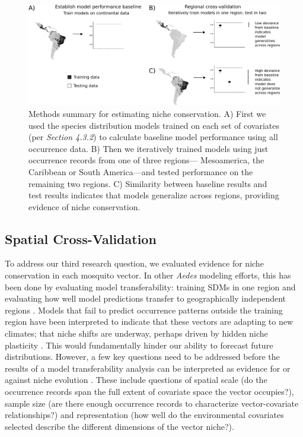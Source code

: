 \begin{figure}
\includegraphics[width=\textwidth]{figures/ch3-cv-conceptual2.pdf}
\centering
\caption[Methods summary for estimating niche conservation.]{Methods summary for estimating niche conservation. A) First we used the species distribution models trained on each set of covariates (per \textit{Section 4.3.2}) to calculate baseline model performance using all occurrence data. B) Then we iteratively trained models using just occurrence records from one of three regions— Mesoamerica, the Caribbean or South America—and tested performance on the remaining two regions. C) Similarity between baseline results and test results indicates that models generalize across regions, providing evidence of niche conservation.}
\label{fig:cv-conceptual}
\end{figure}

\subsection{Spatial Cross-Validation}

To address our third research question, we evaluated evidence for niche conservation in each mosquito vector. In other \textit{Aedes} modeling efforts, this has been done by evaluating model transferability: training SDMs in one region and evaluating how well model predictions transfer to geographically independent regions \cite{Yates2018-hm}. Models that fail to predict occurrence patterns outside the training region have been interpreted to indicate that these vectors are adapting to new climates; that niche shifts are underway, perhaps driven by hidden niche plasticity \cite{Medley2010-fa, Carlson2016-rc}. This would fundamentally hinder our ability to forecast future distributions. However, a few key questions need to be addressed before the results of a model transferability analysis can be interpreted as evidence for or against niche evolution \cite{Liu2020-wk}. These include questions of spatial scale (do the occurrence records span the full extent of covariate space the vector occupies?), sample size (are there enough occurrence records to characterize vector-covariate relationships?) and representation (how well do the environmental covariates selected describe the different dimensions of the vector niche?).

